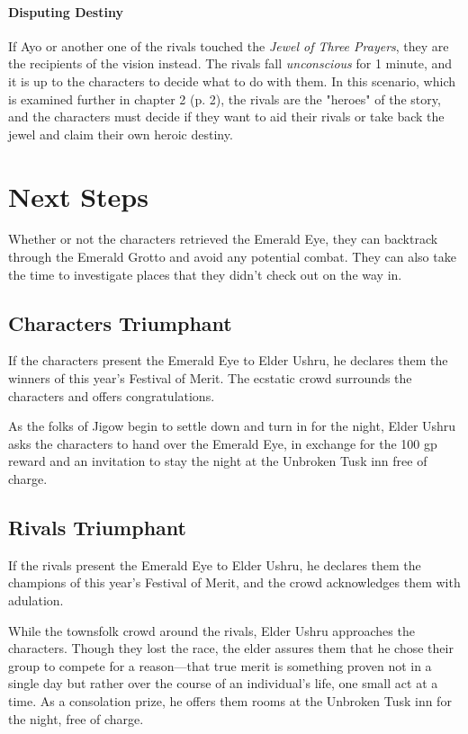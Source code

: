\documentclass[letterpaper, 11pt, bg=full, twocolumn]{dndbook}
\begin{document}
\paragraph{Disputing Destiny}

If Ayo or another one of the rivals touched the \textit{Jewel of Three Prayers}, they are the recipients of the vision instead. The rivals fall \textit{unconscious} for 1 minute, and it is up to the characters to decide what to do with them. In this scenario, which is examined further in chapter 2 (p. 2), the rivals are the "heroes" of the story, and the characters must decide if they want to aid their rivals or take back the jewel and claim their own heroic destiny.

\section{Next Steps}

Whether or not the characters retrieved the Emerald Eye, they can backtrack through the Emerald Grotto and avoid any potential combat. They can also take the time to investigate places that they didn't check out on the way in.

\subsection{Characters Triumphant}

If the characters present the Emerald Eye to Elder Ushru, he declares them the winners of this year's Festival of Merit. The ecstatic crowd surrounds the characters and offers congratulations.

As the folks of Jigow begin to settle down and turn in for the night, Elder Ushru asks the characters to hand over the Emerald Eye, in exchange for the 100 gp reward and an invitation to stay the night at the Unbroken Tusk inn free of charge.

\subsection{Rivals Triumphant}

If the rivals present the Emerald Eye to Elder Ushru, he declares them the champions of this year's Festival of Merit, and the crowd acknowledges them with adulation.

While the townsfolk crowd around the rivals, Elder Ushru approaches the characters. Though they lost the race, the elder assures them that he chose their group to compete for a reason---that true merit is something proven not in a single day but rather over the course of an individual's life, one small act at a time. As a consolation prize, he offers them rooms at the Unbroken Tusk inn for the night, free of charge.
\end{document}
